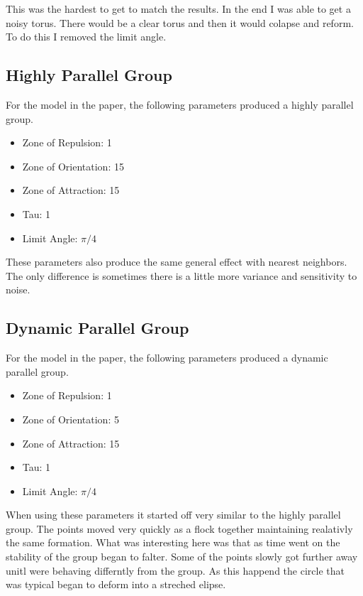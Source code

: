 \documentclass[12pt]{article}
\begin{document}
This was the hardest to get to match the results. In the end I was able to get a noisy torus. There would be a clear torus 
and then it would colapse and reform. To do this I removed the limit angle.

 
\subsection*{Highly Parallel Group}

For the model in the paper, the following parameters produced a highly parallel group.

\begin{itemize}
  \item{Zone of Repulsion: 1}
  \item{Zone of Orientation: 15}
  \item{Zone of Attraction: 15}
  \item{Tau: 1}
  \item{Limit Angle: $\pi / 4$}
\end{itemize}

These parameters also produce the same general effect with nearest neighbors. The only difference is sometimes
there is a little more variance and sensitivity to noise.

\subsection*{Dynamic Parallel Group}

For the model in the paper, the following parameters produced a dynamic parallel group.

\begin{itemize}
  \item{Zone of Repulsion: 1}
  \item{Zone of Orientation: 5}
  \item{Zone of Attraction: 15}
  \item{Tau: 1}
  \item{Limit Angle: $\pi / 4$}
\end{itemize}

When using these parameters it started off very similar to the highly parallel group. The points moved very quickly as a flock
together maintaining realativly the same formation. What was interesting here was that as time went on the stability of the
group began to falter. Some of the points slowly got further away unitl were behaving differntly from the group. As this happend 
the circle that was typical began to deform into a streched elipse.
 
\end{document}
